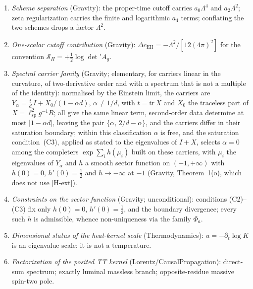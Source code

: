 \documentclass[11pt,a4paper]{article}
\theoremstyle{definition}
\newcommand{\SPI}{\mathcal{S}_\Pi}
\newcommand{\lsp}{\ell_{\mathrm{sp}}}
\newcommand{\cEH}{c_{\mathrm{EH}}}
\begin{document}
      \begin{enumerate}
        \item \textit{Scheme separation} (Gravity):
        the proper-time cutoff carries $a_0\Lambda^4$ and $a_2\Lambda^2$; zeta
        regularization carries the finite and logarithmic $a_4$ terms; conflating the two
        schemes drops a factor $\Lambda^2$.

        \item \textit{One-scalar cutoff contribution} (Gravity):
        $\Delta\cEH = -\Lambda^2/[12(4\pi)^2]$ for the convention
        $\SPI = +\tfrac12\log\det' A_g$.

        \item \textit{Spectral carrier family} (Gravity; elementary, for carriers linear in the curvature, of
        two-derivative order and with a spectrum that is not a multiple of the identity):
        normalised by the Einstein limit, the carriers are
        $Y_\alpha = \tfrac{t}{d}\,I + X_0/(1-\alpha d)$, $\alpha \neq 1/d$, with $t = \mathrm{tr}\,X$ and $X_0$ the
        traceless part of $X = \lsp^2 g^{-1}R$; all give the same linear term, second-order data determine at most
        $|1-\alpha d|$, leaving the pair $\{\alpha,\, 2/d-\alpha\}$, and the carriers differ in their saturation
        boundary; within this classification $\alpha$ is free, and the saturation condition~(C3), applied as stated
        to the eigenvalues of $I + X$, selects $\alpha = 0$ among the completers $\exp\sum_i h(\mu_i)$ built on these
        carriers, with $\mu_i$ the eigenvalues of $Y_\alpha$ and $h$ a smooth sector function on $(-1,+\infty)$ with
        $h(0) = 0$, $h'(0) = \tfrac12$ and $h \to -\infty$ at $-1$ (Gravity, Theorem~1(o), which does not use
        [H-ext]).

        \item \textit{Constraints on the sector function} (Gravity; unconditional):
        conditions (C2)--(C3) fix only $h(0) = 0$, $h'(0) = \tfrac12$, and the boundary
        divergence; every such $h$ is admissible, whence non-uniqueness via the family
        $\Phi_a$.

        \item \textit{Dimensional status of the heat-kernel scale} (Thermodynamics):
        $u = -\partial_t\log K$ is an eigenvalue scale; it is not a temperature.

        \item \textit{Factorization of the posited TT kernel} (Lorentz/CausalPropagation):
        direct-sum spectrum; exactly luminal massless branch; opposite-residue massive
        spin-two pole.
      \end{enumerate}
\end{document}
